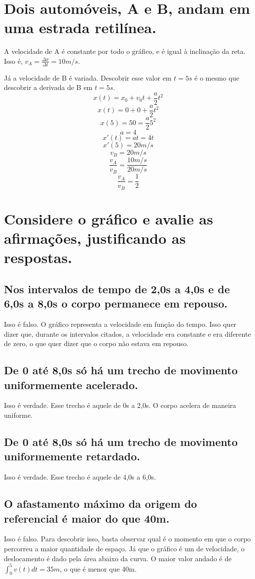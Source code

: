 \documentclass{article}
\begin{document}
\section{Dois automóveis, A e B, andam em uma estrada retilínea.}
    \hspace{\parindent}A velocidade de A é constante por todo o gráfico, e é igual à inclinação da reta. Isso é, \(v_A=\frac{\Delta x}{\Delta t}=10m/s\).
    \par Já a velocidade de B é variada. Descobrir esse valor em \(t=5s\) é o mesmo que descobrir a derivada de B em \(t=5s\).
    \[x(t)=x_0+v_0t+\frac{a}{2}t^2\]
    \[x(t)=0+0+\frac{a}{2}t^2\]
    \[x(5)=50=\frac{a}{2}5^2\]
    \[a=4\]
    \[x'(t)=at=4t\]
    \[x'(5)=20m/s\]
    \[v_B=20m/s\]
    \[\frac{v_A}{v_B}=\frac{10m/s}{20m/s}\]
    \[\frac{v_A}{v_B}=\frac{1}{2}\]

\section{Considere o gráfico e avalie as afirmações, justificando as respostas.}
    \subsection{Nos intervalos de tempo de 2,0s a 4,0s e de 6,0s a 8,0s o corpo permanece em repouso.}
        \hspace{\parindent} Isso é falso. O gráfico representa a velocidade em função do tempo. Isso quer dizer que, durante os intervalos citados, a velocidade era constante e era diferente de zero, o que quer dizer que o corpo não estava em repouso.
    \subsection{De 0 até 8,0s só há um trecho de movimento uniformemente acelerado.}
        \hspace{\parindent} Isso é verdade. Esse trecho é aquele de 0s a 2,0s. O corpo acelera de maneira uniforme.
    \subsection{De 0 até 8,0s só há um trecho de movimento uniformemente retardado.}
        \hspace{\parindent} Isso é verdade. Esse trecho é aquele de 4,0s a 6,0s.
    \subsection{O afastamento máximo da origem do referencial é maior do que 40m.}
        \hspace{\parindent} Isso é falso. Para descobrir isso, basta observar qual é o momento em que o corpo percorreu a maior quantidade de espaço. Já que o gráfico é um de velocidade, o deslocamento é dado pela área abaixo da curva. O maior valor andado é de \(\int_0^5v(t)dt=35m\), o que é menor que 40m.
\end{document}
